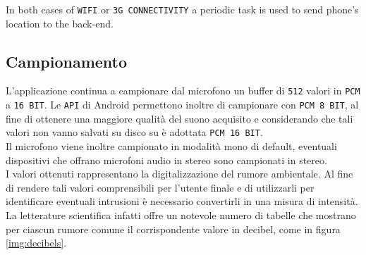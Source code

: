 In both cases of \texttt{WIFI} or \texttt{3G CONNECTIVITY} a periodic task is used to send phone's location to the back-end.

\subsection{Campionamento}
L'applicazione continua a campionare dal microfono un buffer di \texttt{512} valori in \texttt{PCM} a \texttt{16 BIT}.
Le \texttt{API} di Android permettono inoltre di campionare con \texttt{PCM 8 BIT}, al fine di ottenere una maggiore qualità del suono acquisito e considerando che tali valori non vanno salvati su disco su è adottata \texttt{PCM 16 BIT}.\\
Il microfono viene inoltre campionato in modalità mono di default, eventuali dispositivi che offrano microfoni audio in stereo sono campionati in stereo.\\

I valori ottenuti rappresentano la digitalizzazione del rumore ambientale. Al fine di rendere tali valori comprensibili per l'utente finale e di utilizzarli per identificare eventuali intrusioni è necessario convertirli in una misura di intensità. La letterature scientifica infatti offre un notevole numero di tabelle che mostrano per ciascun rumore comune il corrispondente valore in decibel, come in figura \ref{img:decibels}. 

